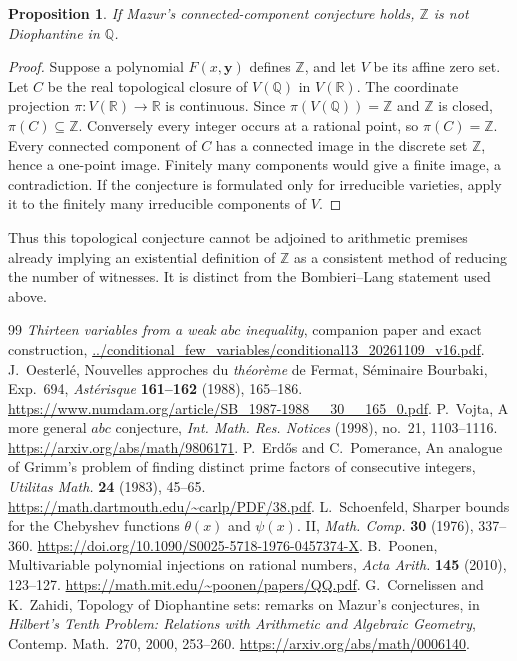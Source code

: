\documentclass[11pt,a4paper]{article}
\newtheorem{proposition}[theorem]{Proposition}
\newcommand{\Q}{\mathbb Q}\newcommand{\Z}{\mathbb Z}
\begin{document}
\begin{proposition}
If Mazur's connected-component conjecture holds, $\Z$ is
not Diophantine in $\Q$.
\end{proposition}
\begin{proof}
Suppose a polynomial $F(x,\mathbf y)$ defines $\Z$, and let
$V$ be its affine zero set. Let $C$ be the real topological
closure of $V(\Q)$ in $V(\mathbb R)$. The coordinate projection
$\pi:V(\mathbb R)\to\mathbb R$ is continuous. Since
$\pi(V(\Q))=\Z$ and $\Z$ is closed,
$\pi(C)\subseteq\Z$. Conversely every integer occurs at a
rational point, so $\pi(C)=\Z$.
Every connected component of $C$ has a connected image in
the discrete set $\Z$, hence a one-point image.
Finitely many components would give a finite image, a
contradiction. If the conjecture is formulated only for
irreducible varieties, apply it to the finitely many
irreducible components of $V$.
\end{proof}

Thus this topological conjecture cannot be adjoined to
arithmetic premises already implying an existential definition
of $\Z$ as a consistent method of reducing the number of witnesses.
It is distinct from the Bombieri--Lang statement used above.

\begin{thebibliography}{99}
\emph{Thirteen variables from a weak $abc$ inequality},
companion paper and exact construction,
\url{../conditional_few_variables/conditional13_20261109_v16.pdf}.
J.~Oesterl\'e,
Nouvelles approches du \emph{th\'eor\`eme} de Fermat,
S\'eminaire Bourbaki, Exp.~694,
\emph{Ast\'erisque} \textbf{161--162} (1988), 165--186.
\url{https://www.numdam.org/article/SB_1987-1988__30__165_0.pdf}.
P.~Vojta, A more general $abc$ conjecture,
\emph{Int. Math. Res. Notices} (1998), no.~21, 1103--1116.
\url{https://arxiv.org/abs/math/9806171}.
P.~Erd\H{o}s and C.~Pomerance,
An analogue of Grimm's problem of finding distinct prime
factors of consecutive integers,
\emph{Utilitas Math.} \textbf{24} (1983), 45--65.
\url{https://math.dartmouth.edu/~carlp/PDF/38.pdf}.
L.~Schoenfeld, Sharper bounds for the Chebyshev functions
$\theta(x)$ and $\psi(x)$. II,
\emph{Math. Comp.} \textbf{30} (1976), 337--360.
\url{https://doi.org/10.1090/S0025-5718-1976-0457374-X}.
B.~Poonen, Multivariable polynomial injections on rational numbers,
\emph{Acta Arith.} \textbf{145} (2010), 123--127.
\url{https://math.mit.edu/~poonen/papers/QQ.pdf}.
G.~Cornelissen and K.~Zahidi,
Topology of Diophantine sets: remarks on Mazur's conjectures,
in \emph{Hilbert's Tenth Problem: Relations with Arithmetic
and Algebraic Geometry}, Contemp. Math.~270, 2000, 253--260.
\url{https://arxiv.org/abs/math/0006140}.
\end{thebibliography}
\end{document}

